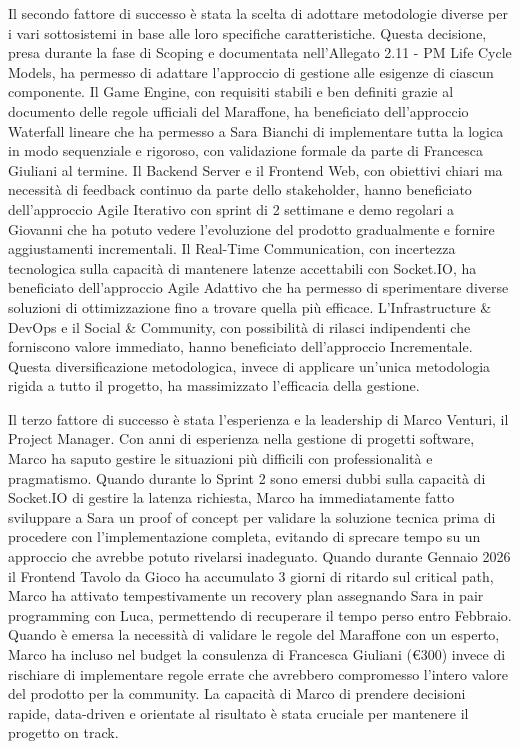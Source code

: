 Il secondo fattore di successo è stata la scelta di adottare metodologie diverse per i vari sottosistemi in base alle loro specifiche caratteristiche. Questa decisione, presa durante la fase di Scoping e documentata nell'Allegato 2.11 - PM Life Cycle Models, ha permesso di adattare l'approccio di gestione alle esigenze di ciascun componente. Il Game Engine, con requisiti stabili e ben definiti grazie al documento delle regole ufficiali del Maraffone, ha beneficiato dell'approccio Waterfall lineare che ha permesso a Sara Bianchi di implementare tutta la logica in modo sequenziale e rigoroso, con validazione formale da parte di Francesca Giuliani al termine. Il Backend Server e il Frontend Web, con obiettivi chiari ma necessità di feedback continuo da parte dello stakeholder, hanno beneficiato dell'approccio Agile Iterativo con sprint di 2 settimane e demo regolari a Giovanni che ha potuto vedere l'evoluzione del prodotto gradualmente e fornire aggiustamenti incrementali. Il Real-Time Communication, con incertezza tecnologica sulla capacità di mantenere latenze accettabili con Socket.IO, ha beneficiato dell'approccio Agile Adattivo che ha permesso di sperimentare diverse soluzioni di ottimizzazione fino a trovare quella più efficace. L'Infrastructure \& DevOps e il Social \& Community, con possibilità di rilasci indipendenti che forniscono valore immediato, hanno beneficiato dell'approccio Incrementale. Questa diversificazione metodologica, invece di applicare un'unica metodologia rigida a tutto il progetto, ha massimizzato l'efficacia della gestione.

Il terzo fattore di successo è stata l'esperienza e la leadership di Marco Venturi, il Project Manager. Con anni di esperienza nella gestione di progetti software, Marco ha saputo gestire le situazioni più difficili con professionalità e pragmatismo. Quando durante lo Sprint 2 sono emersi dubbi sulla capacità di Socket.IO di gestire la latenza richiesta, Marco ha immediatamente fatto sviluppare a Sara un proof of concept per validare la soluzione tecnica prima di procedere con l'implementazione completa, evitando di sprecare tempo su un approccio che avrebbe potuto rivelarsi inadeguato. Quando durante Gennaio 2026 il Frontend Tavolo da Gioco ha accumulato 3 giorni di ritardo sul critical path, Marco ha attivato tempestivamente un recovery plan assegnando Sara in pair programming con Luca, permettendo di recuperare il tempo perso entro Febbraio. Quando è emersa la necessità di validare le regole del Maraffone con un esperto, Marco ha incluso nel budget la consulenza di Francesca Giuliani (€300) invece di rischiare di implementare regole errate che avrebbero compromesso l'intero valore del prodotto per la community. La capacità di Marco di prendere decisioni rapide, data-driven e orientate al risultato è stata cruciale per mantenere il progetto on track.

